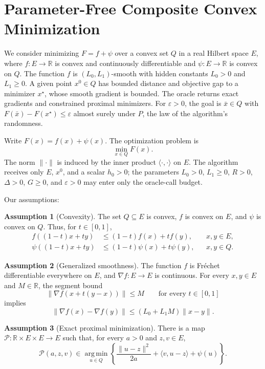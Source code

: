 \documentclass[10pt]{article}
\theoremstyle{definition}
\newtheorem{assumption}{Assumption}
\begin{document}
\section*{Parameter-Free Composite Convex Minimization}
We consider minimizing $F=f+\psi$ over a convex set $Q$ in a real Hilbert space $E$, where $f:E\to\mathbb{R}$ is convex and continuously differentiable and $\psi:E\to\mathbb{R}$ is convex on $Q$. The function $f$ is $(L_0,L_1)$-smooth with hidden constants $L_0>0$ and $L_1\geq0$. A given point $x^0\in Q$ has bounded distance and objective gap to a minimizer $x^\star$, whose smooth gradient is bounded. The oracle returns exact gradients and constrained proximal minimizers. For $\varepsilon>0$, the goal is $\bar{x}\in Q$ with $F(\bar{x})-F(x^\star)\leq\varepsilon$ almost surely under $P$, the law of the algorithm's randomness.

Write $F(x)=f(x)+\psi(x)$. The optimization problem is
\[
\min_{x\in Q} F(x).
\]
The norm $\|\cdot\|$ is induced by the inner product $\langle\cdot,\cdot\rangle$ on $E$. The algorithm receives only $E$, $x^0$, and a scalar $h_0>0$; the parameters $L_0>0$, $L_1\geq0$, $R>0$, $\Delta>0$, $G\geq0$, and $\varepsilon>0$ may enter only the oracle-call budget.

Our assumptions:
\begin{assumption}[Convexity]
The set $Q\subseteq E$ is convex, $f$ is convex on $E$, and $\psi$ is convex on $Q$. Thus, for $t\in[0,1]$,
\[
\begin{aligned}
f((1-t)x+ty)&\leq(1-t)f(x)+tf(y), &&x,y\in E,\\
\psi((1-t)x+ty)&\leq(1-t)\psi(x)+t\psi(y), &&x,y\in Q.
\end{aligned}
\]
\end{assumption}

\begin{assumption}[Generalized smoothness]
The function $f$ is Fr\'echet differentiable everywhere on $E$, and $\nabla f:E\to E$ is continuous. For every $x,y\in E$ and $M\in\mathbb{R}$, the segment bound
\[
\|\nabla f(x+t(y-x))\|\leq M
\qquad\text{for every }t\in[0,1]
\]
implies
\[
\|\nabla f(x)-\nabla f(y)\|
\leq (L_0+L_1M)\|x-y\|.
\]
\end{assumption}

\begin{assumption}[Exact proximal minimization]
There is a map $\mathcal{P}:\mathbb{R}\times E\times E\to E$ such that, for every $a>0$ and $z,v\in E$,
\[
\mathcal{P}(a,z,v)\in
\operatorname*{arg\,min}_{u\in Q}
\left\{\frac{\|u-z\|^2}{2a}
+\langle v,u-z\rangle+\psi(u)\right\}.
\]
\end{assumption}
\end{document}
